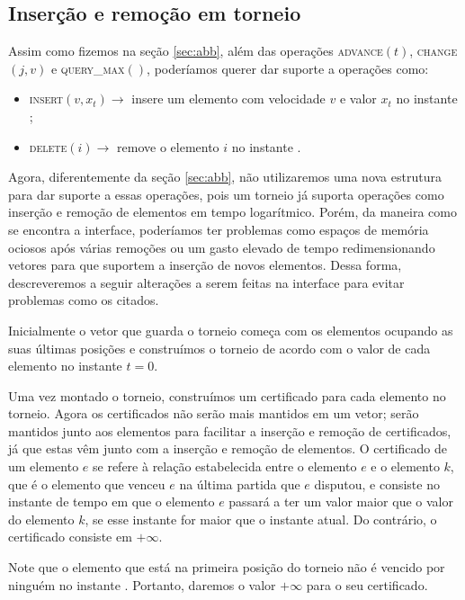 
\FloatBarrier

\subsection{Inserção e remoção em torneio} \label{trni:secao}

Assim como fizemos na seção \ref{sec:abb}, além das operações
\textsc{advance}$(t)$, \textsc{change}$(j, v)$ e
\textsc{query\_max}$()$, poderíamos querer dar suporte a operações
como:

\begin{itemize}
    \item \textsc{insert}$(v, x_t)\rightarrow$ insere um elemento
    com velocidade $v$ e valor $x_t$ no instante \now;
    \item \textsc{delete}$(i) \rightarrow$ remove o elemento $i$ no
    instante \now.
\end{itemize}
Agora, diferentemente da seção \ref{sec:abb}, não utilizaremos uma nova
estrutura para dar suporte a essas operações, pois um torneio já
suporta operações como inserção e remoção de elementos em tempo
logarítmico. Porém, da maneira como se encontra a interface,
poderíamos ter problemas como espaços de memória ociosos após várias
remoções ou um gasto elevado de tempo redimensionando vetores para
que suportem a inserção de novos elementos. Dessa forma,
descreveremos a seguir alterações a serem feitas na interface para
evitar problemas como os citados.

Inicialmente o vetor que guarda o torneio começa com os elementos
ocupando as suas últimas posições e construímos o torneio de acordo
com o valor de cada elemento no instante $t = 0$.

Uma vez montado o torneio, construímos um certificado para cada
elemento no torneio. Agora os certificados não serão mais mantidos
em um vetor; serão mantidos junto aos elementos para facilitar a
inserção e remoção de certificados, já que estas vêm junto com a
inserção e remoção de elementos. O certificado de um elemento $e$ se
refere à relação estabelecida entre o elemento $e$ e o elemento $k$,
que é o elemento que venceu $e$ na última partida que $e$ disputou,
e consiste no instante de tempo em que o elemento $e$ passará a ter
um valor maior que o valor do elemento $k$, se esse instante for
maior que o instante atual. Do contrário, o certificado consiste em
$+\infty$.

Note que o elemento que está na primeira posição do torneio não é
vencido por ninguém no instante \now. Portanto, daremos o valor
$+\infty$ para o seu certificado.

